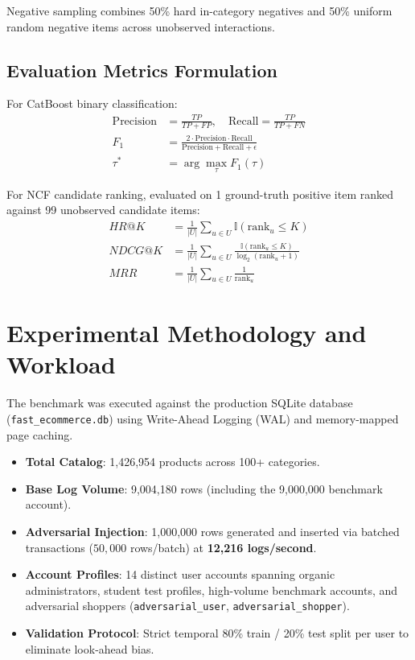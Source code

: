 \documentclass[11pt,a4paper]{article}
\begin{document}
Negative sampling combines 50\% hard in-category negatives and 50\% uniform random negative items across unobserved interactions.

\subsection{Evaluation Metrics Formulation}
For CatBoost binary classification:
\begin{align}
    \text{Precision} &= \frac{TP}{TP + FP}, \quad \text{Recall} = \frac{TP}{TP + FN} \\
    F_1 &= \frac{2 \cdot \text{Precision} \cdot \text{Recall}}{\text{Precision} + \text{Recall} + \epsilon} \\
    \tau^* &= \arg\max_\tau F_1(\tau)
\end{align}

For NCF candidate ranking, evaluated on 1 ground-truth positive item ranked against 99 unobserved candidate items:
\begin{align}
    HR@K &= \frac{1}{|U|} \sum_{u \in U} \mathbb{I}(\text{rank}_u \le K) \\
    NDCG@K &= \frac{1}{|U|} \sum_{u \in U} \frac{\mathbb{I}(\text{rank}_u \le K)}{\log_2(\text{rank}_u + 1)} \\
    MRR &= \frac{1}{|U|} \sum_{u \in U} \frac{1}{\text{rank}_u}
\end{align}

\section{Experimental Methodology and Workload}
The benchmark was executed against the production SQLite database (\texttt{fast\_ecommerce.db}) using Write-Ahead Logging (WAL) and memory-mapped page caching.

\begin{itemize}
    \item \textbf{Total Catalog}: 1,426,954 products across 100+ categories.
    \item \textbf{Base Log Volume}: 9,004,180 rows (including the 9,000,000 benchmark account).
    \item \textbf{Adversarial Injection}: 1,000,000 rows generated and inserted via batched transactions ($50,000$ rows/batch) at \textbf{12,216 logs/second}.
    \item \textbf{Account Profiles}: 14 distinct user accounts spanning organic administrators, student test profiles, high-volume benchmark accounts, and adversarial shoppers (\texttt{adversarial\_user}, \texttt{adversarial\_shopper}).
    \item \textbf{Validation Protocol}: Strict temporal 80\% train / 20\% test split per user to eliminate look-ahead bias.
\end{itemize}
\end{document}
